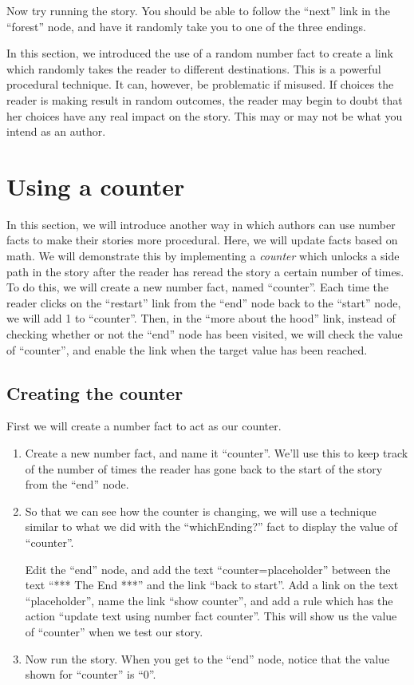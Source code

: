 \documentclass{article}
\begin{document}
\noindent Now try running the story. You should be able to follow the ``next'' 
link in the ``forest'' node, and have it randomly take you to one of 
the three endings.

In this section, we introduced the use of a random number fact to 
create a link which randomly takes the reader to different 
destinations. This is a powerful procedural technique. It can, 
however, be problematic if misused. If choices the reader is making 
result in random outcomes, the reader may begin to doubt that her 
choices have any real impact on the story. This may or may not be 
what you intend as an author.

\section{Using a counter}

In this section, we will introduce another way in which authors can 
use number facts to make their stories more procedural. Here, we will 
update facts based on math. We will demonstrate this by implementing 
a \textit{counter} which unlocks a side path in the story after the 
reader has reread the story a certain number of times. To do this, we 
will create a new number fact, named ``counter''. Each time the 
reader clicks on the ``restart'' link from the ``end'' node back to 
the ``start'' node, we will add 1 to ``counter''. Then, in the ``more 
about the hood'' link, instead of checking whether or not the ``end'' 
node has been visited, we will check the value of ``counter'', and 
enable the link when the target value has been reached.

\subsection{Creating the counter}

First we will create a number fact to act as our counter.

\begin{enumerate}
    \item Create a new number fact, and name it ``counter''. We'll 
    use this to keep track of the number of times the reader has gone 
    back to the start of the story from the ``end'' node.
    \item So that we can see how the counter is changing, we will use 
    a technique similar to what we did with the ``whichEnding?'' fact 
    to display the value of ``counter''.
    
    Edit the ``end'' node, and add the text ``counter=placeholder'' 
    between the text ``*** The End ***'' and the link ``back to 
    start''. Add a link on the text ``placeholder'', name the link 
    ``show counter'', and add a rule which has the action ``update 
    text using number fact counter''. This will show us the value of 
    ``counter'' when we test our story.
\item Now run the story. When you get to the ``end'' node, notice that the 
value shown for ``counter'' is ``0''. 
\end{enumerate}
\end{document}

